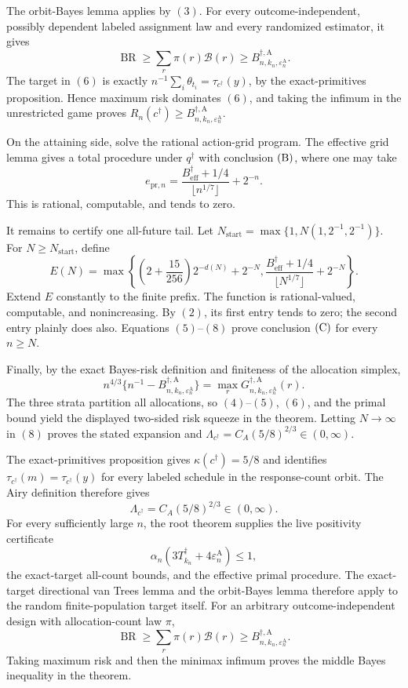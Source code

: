 The orbit-Bayes lemma applies by \((3)\).  For every outcome-independent, possibly dependent labeled assignment law and every randomized estimator, it gives
\[
\operatorname{BR}\ge\sum_r\pi(r)\mathcal B(r)
\ge B_{n,k_n,\varepsilon_n^{\mathrm A}}^{\dagger,\mathrm A}.
\tag{6}
\]
The target in \((6)\) is exactly
\(n^{-1}\sum_i\theta_{t_i}=\tau_{c^\dagger}(y)\), by the exact-primitives proposition.  Hence maximum risk dominates \((6)\), and taking the infimum in the unrestricted game proves
\(R_n(c^\dagger)\ge B_{n,k_n,\varepsilon_n^{\mathrm A}}^{\dagger,\mathrm A}\).

On the attaining side, solve the rational action-grid program.  The effective grid lemma gives a total procedure under \(q^\dagger\) with conclusion \({\rm(B)}\), where one may take
\[
e_{\mathrm{pr},n}=
\frac{B_{\mathrm{eff}}^\dagger+1/4}{\lfloor n^{1/7}\rfloor}+2^{-n}.
\tag{7}
\]
This is rational, computable, and tends to zero.

It remains to certify one all-future tail.  Let
\(N_{\mathrm{start}}=\max\{1,N(1,2^{-1},2^{-1})\}\).  For
\(N\ge N_{\mathrm{start}}\), define
\[
E(N)=\max\left\{
\left(2+\frac{15}{256}\right)2^{-d(N)}+2^{-N},
\frac{B_{\mathrm{eff}}^\dagger+1/4}{\lfloor N^{1/7}\rfloor}+2^{-N}
\right\}.
\tag{8}
\]
Extend \(E\) constantly to the finite prefix.  The function is rational-valued, computable, and nonincreasing.  By \((2)\), its first entry tends to zero; the second entry plainly does also.  Equations \((5)\)--\((8)\) prove conclusion \({\rm(C)}\) for every \(n\ge N\).

Finally, by the exact Bayes-risk definition and finiteness of the allocation simplex,
\[
n^{4/3}\{n^{-1}-B_{n,k_n,\varepsilon_n^{\mathrm A}}^{\dagger,\mathrm A}\}
=\max_rG_{n,k_n,\varepsilon_n^{\mathrm A}}^{\dagger,\mathrm A}(r).
\tag{9}
\]
The three strata partition all allocations, so \((4)\)--\((5)\), \((6)\), and the primal bound yield the displayed two-sided risk squeeze in the theorem.  Letting \(N\to\infty\) in \((8)\) proves the stated expansion and
\(\Lambda_{c^\dagger}=C_A(5/8)^{2/3}\in(0,\infty)\).

The exact-primitives proposition gives
\(\kappa(c^\dagger)=5/8\) and identifies
\(\tau_{c^\dagger}(m)=\tau_{c^\dagger}(y)\) for every labeled schedule in the response-count orbit.  The Airy definition therefore gives
\[
\Lambda_{c^\dagger}=C_A(5/8)^{2/3}\in(0,\infty).
\tag{1}
\]
For every sufficiently large \(n\), the root theorem supplies the live positivity certificate
\[
\alpha_n(3T_{k_n}^\dagger+4\varepsilon_n^{\mathrm A})\le1,
\tag{2}
\]
the exact-target all-count bounds, and the effective primal procedure.  The exact-target directional van Trees lemma and the orbit-Bayes lemma therefore apply to the random finite-population target itself.  For an arbitrary outcome-independent design with allocation-count law \(\pi\),
\[
\operatorname{BR}\ge\sum_r\pi(r)\mathcal B(r)
\ge B_{n,k_n,\varepsilon_n^{\mathrm A}}^{\dagger,\mathrm A}.
\tag{3}
\]
Taking maximum risk and then the minimax infimum proves the middle Bayes inequality in the theorem.


